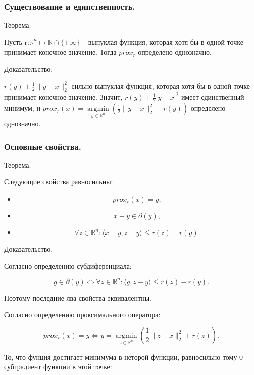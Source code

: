 \subsubsection*{Существование и единственность.}

Теорема.

Пусть r:$\mathbb{R}^n\mapsto \mathbb{R}\cap\{+\infty\}$ -- выпуклая функция, которая хотя бы в одной точке принимает конечное значение.
Тогда $prox_r$ определено однозначно.

Доказательство:

$r(y)+\frac12\|y-x\|_2^2$ сильно выпуклая функция, которая хотя бы в одной точке принимает конечное значение. Значит, $r(y)+\frac12|y-x|^2$ имеет единственный минимум, и $prox_r(x)=\mathop{argmin}\limits_{y\in\mathbb{R}^n}\left(\frac12\|y-x\|_2^2+r(y)\right)$ определено однозначно.

\subsubsection*{Основные свойства.}

Теорема.

Следующие свойства равносильны:

\begin{itemize}
    \item\[prox_r(x)=y,\]
    \item\[x-y\in\partial(y),\]
    \item\[\forall z\in\mathbb{R}^n:\langle x-y,z-y\rangle\leq r(z)-r(y).\]
\end{itemize}

Доказательство.

Согласно определению субдиференциала:

\begin{equation}
    g\in\partial(y)\iff\forall z\in\mathbb{R}^n:\langle g,z-y\rangle\leq r(z)-r(y).
\end{equation}

Поэтому последние лва свойства эквивалентны.

Согласно определению проксимального оператора:

\begin{equation}
    prox_r(x)=y\iff y=\mathop{argmin}\limits_{z\in\mathbb{R}^n}\left(\frac12\|z-x\|_2^2+r(z)\right).
\end{equation}

То, что фунция достигает минимума в неторой функции, равносильно тому 0 -- субградиент функции в этой точке:

